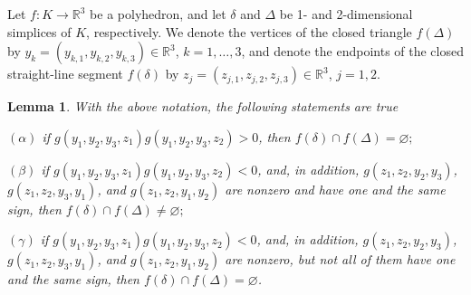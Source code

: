 \documentclass[12pt, reqno]{amsart}
\newtheorem{lemma}{Lemma}
\begin{document}
Let
$f: K\to\mathbb{R}^3$
be a polyhedron, and let 
$\delta$
and 
$\Delta$
be 1- and 2-dimensional simplices of
$K$, 
respectively.
We denote the vertices of the closed triangle
$f(\Delta)$
by 
$y_k=(y_{k,1},y_{k,2},y_{k,3})\in\mathbb{R}^3$, $k=1,\dots,3$,
and denote the endpoints of the closed straight-line segment
$f(\delta)$
by
$z_j=(z_{j,1},z_{j,2},z_{j,3})\in\mathbb{R}^3$, $j=1,2$.

\begin{lemma}\label{lemma2}
With the above notation, the following statements are true
\par
$(\alpha)$ 
if 
$g(y_1, y_2, y_3, z_1)g(y_1, y_2, y_3, z_2)>0$, then 
$f(\delta)\cap f(\Delta)=\varnothing;$

$(\beta)$
if 
$g(y_1, y_2, y_3, z_1)g(y_1, y_2, y_3, z_2)<0$, 
and, in addition,
$g(z_1, z_2, y_2, y_3)$, $g(z_1, z_2, y_3, y_1)$,
and
$g(z_1, z_2, y_1, y_2)$
are nonzero and have one and the same sign, then 
$f(\delta)\cap f(\Delta)\neq\varnothing;$

$(\gamma)$ 
if 
$g(y_1, y_2, y_3, z_1)g(y_1, y_2, y_3, z_2)<0$, 
and, in addition,
$g(z_1, z_2, y_2, y_3)$, $g(z_1, z_2, y_3, y_1)$,
and
$g(z_1, z_2, y_1, y_2)$
are nonzero, but not all of them have one and the same sign, then 
$f(\delta)\cap f(\Delta)=\varnothing$.
\end{lemma}
\end{document}
